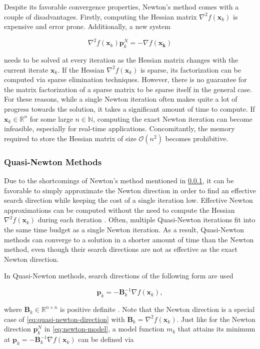 Despite its favorable convergence properties, Newton's method comes with a couple of disadvantages. Firstly, computing the Hessian matrix
$\nabla^2 f(\bm{x}_k)$ is expensive and error prone. Additionally, a new system 

\[
    \nabla^2 f(\bm{x}_k) \bm{p}^N_k = - \nabla f(\bm{x_k})
\]

\noindent needs to be solved at every iteration as the Hessian matrix changes with the current iterate $\bm{x}_k$.
If the Hessian $\nabla^2 f(\bm{x}_k)$ is sparse, its factorization can be computed via sparse elimination techniques. However, there is no
guarantee for the matrix factorization of a sparse matrix to be sparse itself in the general case.
For these reasons, while a single
Newton iteration often makes quite a lot of progress towards the solution, it takes a significant amount of time to compute. If $\bm{x}_k
\in \mathbb{R}^n$ for some large $n \in \mathbb{N}$, computing the exact Newton iteration can become infeasible, especially for real-time
applications. Concomitantly, the memory required to store the Hessian matrix of size $\mathcal{O}(n^2)$ becomes prohibitive.

\subsubsection{Quasi-Newton Methods}\label{sss:quasi-newton}
Due to the shortcomings of Newton's method mentioned in \cref{sss:quasi-newton}, it can be favorable to simply approximate the Newton 
direction
in order to find an effective search direction while keeping the cost of a single iteration low. Effective Newton approximations can be 
computed without the need to compute the Hessian $\nabla^2 f(\bm{x}_k)$ during each iteration \cite{nocedal2006}. Often, multiple Quasi-Newton 
iterations fit into the same time budget as a single Newton iteration. As a result, Quasi-Newton methods can converge to a solution in a 
shorter amount of time than the Newton method, even though their search directions are not as effective as the exact Newton direction.

In Quasi-Newton methods, search directions of the following form are used

\begin{equation}\label{eq:quasi-newton-direction}
    \bm{p}_k = -\bm{B}^{-1}_k \nabla f(\bm{x}_k),
\end{equation}

\noindent where $\bm{B}_k \in \mathbb{R}^{n \times n}$ is positive definite \cite{nocedal2006}. Note that the Newton direction is a special 
case of 
\cref{eq:quasi-newton-direction} with $\bm{B}_k = \nabla^2 f(\bm{x}_k)$. Just like for the Newton direction $\bm{p}^N_k$ in
\cref{eq:newton-model}, a model function $m_k$ 
that attains its minimum at $\bm{p}_k  = -\bm{B}^{-1}_k \nabla f(\bm{x}_k)$ can be defined via

